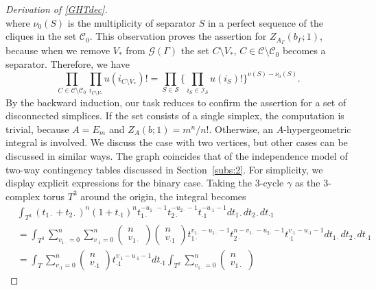 \documentclass[a4paper,12pt]{article}
\theoremstyle{plain}
\theoremstyle{remark}
\begin{document}
\begin{proof}[Derivation of \eqref{GHTdec}]
\[  \]
  where $\nu_0(S)$ is the multiplicity of separator $S$
  in a perfect sequence of the cliques in the set $\mathcal{C}_0$.
  This observation proves the assertion for
  $Z_{A_{\Gamma}}(b_{\Gamma};1)$, because when we remove
  $V_*$ from $\mathcal{G}(\Gamma)$ the set
  $C\setminus V_*$, $C\in\mathcal{C}\setminus\mathcal{C}_0$
  becomes a separator. Therefore, we have
  \[
    \prod_{C \in\mathcal{C}\setminus\mathcal{C}_0}
    \prod_{i_{C\setminus V_*}}u(i_{C\setminus V_*})!
    =\prod_{S\in\mathcal{S}}\{\prod_{i_S\in\mathcal{I}_S}
    u(i_S)!\}^{\nu(S)-\nu_0(S)}.
  \]
  By the backward induction, our task reduces to confirm
  the assertion for a set of disconnected simplices. If
  the set consists of a single simplex, the computation is
  trivial, because $A=E_m$ and $Z_A(b;1)=m^n/n!$. Otherwise,
  an $A$-hypergeometric integral is involved. We discuss
  the case with two vertices, but other cases can be discussed
  in similar ways. The graph coincides that of the independence
  model of two-way contingency tables discussed in
  Section~\ref{subs:2}. For simplicity, we display explicit
  expressions for the binary case. Taking the 3-cycle $\gamma$
  as the 3-complex torus $T^3$ around the origin, the integral
  becomes
  \begin{align*}
    &\int_{T^3}
    (t_{1\cdot}+t_{2\cdot})^n(1+t_{\cdot 1})^n
    t_{1\cdot}^{-u_{1\cdot}-1}t_{2\cdot}^{-u_{2\cdot}-1}
    t_{\cdot1}^{-u_{\cdot1}-1}dt_{1\cdot}dt_{2\cdot}
    dt_{\cdot1}\\
    &=\int_{T^3}
    \sum_{v_{1\cdot}=0}^n\sum_{v_{\cdot1}=0}^n
    \left(\begin{array}{c}n\\v_{1\cdot}\end{array}\right)
    \left(\begin{array}{c}n\\v_{\cdot1}\end{array}\right)
    t_{1\cdot}^{v_{1\cdot}-u_{1\cdot}-1}
    t_{2\cdot}^{n-v_{1\cdot}-u_{2\cdot}-1}
    t_{\cdot1}^{v_{\cdot1}-u_{\cdot1}-1}dt_{1\cdot}dt_{2\cdot}
    dt_{\cdot1}\\
    &=
    \int_{T}\sum_{v_{\cdot1}=0}^n
    \left(\begin{array}{c}n\\v_{\cdot1}\end{array}\right)
    t_{\cdot1}^{v_{\cdot1}-u_{\cdot1}-1}dt_{\cdot1}
    \int_{T^2}\sum_{v_{1\cdot}=0}^n
    \left(\begin{array}{c}n\\v_{1\cdot}\end{array}\right)

\end{align*}
\end{proof}
\end{document}
